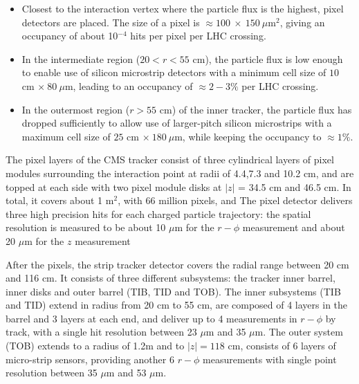 \begin{itemize}
\item  Closest to the interaction vertex where the particle flux is the highest, pixel detectors are placed. The size of a pixel is $\approx 100~\times~150 ~\mu$m$^{2}$, giving an occupancy of about 10$^{-4}$ hits per pixel per LHC crossing.
\item In the intermediate region ($20 < r < 55$ cm), the particle flux is low enough to enable use of silicon microstrip detectors with a minimum cell size of $10$ cm $\times~80~\mu$m, leading to an occupancy of $\approx 2-3\%$ per LHC crossing.
\item In the outermost region ($r > 55$ cm) of the inner tracker, the particle flux has dropped sufficiently to allow use of larger-pitch silicon microstrips with a maximum cell size of $25$ cm $\times~180~\mu$m, while keeping the occupancy to $\approx 1\%$.
\end{itemize}

The pixel layers of the CMS tracker consist of three cylindrical layers of pixel modules surrounding the interaction point at radii of 4.4,7.3 and 10.2 cm, and are topped at each side with two pixel module disks at $|z|$ = 34.5 cm and 46.5 cm. 
In total, it covers about 1 m$^{2}$, with 66 million pixels, and
The pixel detector delivers three high precision hits for each charged particle trajectory: the spatial resolution is measured to be about 10 $\mu$m for the $r-\phi$ measurement and about 20 $\mu$m for the $z$ measurement

After the pixels, the strip tracker detector covers the radial range between 20 cm and 116 cm. 
It consists of three different subsystems: the tracker inner barrel, inner disks and outer barrel (TIB, TID and TOB). 
The inner subsystems (TIB and TID) extend in radius from 20 cm to 55 cm, are composed of 4 layers in the barrel and 3 layers at each end, and deliver up to 4 measurements in $r-\phi$ by track, with a single hit resolution between 23 $\mu$m and 35 $\mu$m. 
The outer system (TOB) extends to a radius of 1.2m and to $|z| = 118$ cm, consists of 6 layers of micro-strip sensors, providing another 6 $r-\phi$ measurements with single point resolution between 35 $\mu$m and 53 $\mu$m. 

